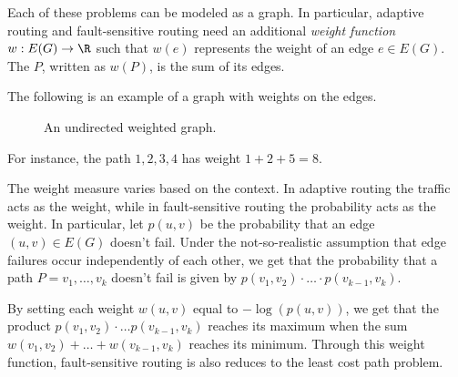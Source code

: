 \documentclass[a4paper, 12pt]{report}
\begin{document}
    Each of these problems can be modeled as a graph. In particular, adaptive routing and fault-sensitive routing need an additional \textit{weight function} $w : E(G) \to \R$ such that $w(e)$ represents the weight of an edge $e \in E(G)$. The  $P$, written as $w(P)$, is the sum of its edges.

    \begin{example}
        The following is an example of a graph with weights on the edges.

        \begin{figure}[H]
            \centering
            \caption{An undirected weighted graph.}
        \end{figure}

        For instance, the path $1, 2, 3, 4$ has weight $1 + 2 + 5 = 8$.
    \end{example}
    
    The weight measure varies based on the context. In adaptive routing the traffic acts as the weight, while in fault-sensitive routing the probability acts as the weight. In particular, let $p(u,v)$ be the probability that an edge $(u,v) \in E(G)$ doesn't fail. Under the not-so-realistic assumption that edge failures occur independently of each other, we get that the probability that a path $P = v_1, \ldots, v_k$ doesn't fail is given by $p(v_1, v_2) \cdot \ldots \cdot p(v_{k-1}, v_k)$.
    
    By setting each weight $w(u,v)$ equal to $-\log(p(u,v))$, we get that the product $p(v_1, v_2) \cdot \ldots p(v_{k-1}, v_k)$ reaches its maximum when the sum $w(v_1, v_2) + \ldots + w(v_{k-1}, v_k)$ reaches its minimum. Through this weight function, fault-sensitive routing is also reduces to the least cost path problem.
\end{document}
